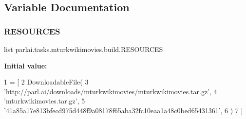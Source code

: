 \subsection{Variable Documentation}
\mbox{\label{namespaceparlai_1_1tasks_1_1mturkwikimovies_1_1build_a701dd8bdee4e94953caf63360f50137b}} 
\subsubsection{\texorpdfstring{R\+E\+S\+O\+U\+R\+C\+ES}{RESOURCES}}
{\footnotesize\ttfamily list parlai.\+tasks.\+mturkwikimovies.\+build.\+R\+E\+S\+O\+U\+R\+C\+ES}

{\bfseries Initial value\+:}
\begin{DoxyCode}
1 =  [
2     DownloadableFile(
3         \textcolor{stringliteral}{'http://parl.ai/downloads/mturkwikimovies/mturkwikimovies.tar.gz'},
4         \textcolor{stringliteral}{'mturkwikimovies.tar.gz'},
5         \textcolor{stringliteral}{'41a85a17e813bfecd975d448f9a08178f65aba32fc10eaa1a48c0bed65431361'},
6     )
7 ]
\end{DoxyCode}
